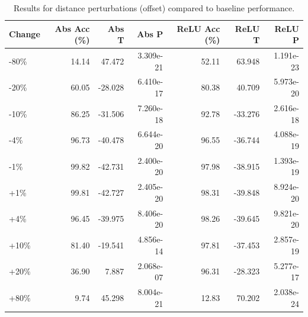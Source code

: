 \begin{table}[h]
    \centering
    \begin{tabular}{lrrrrrr}
    \hline
    Change & Abs Acc (\%) & Abs T & Abs P & ReLU Acc (\%) & ReLU T & ReLU P \\
    \hline
    -80\% & 14.14 & 47.472 & 3.309e-21 & 52.11 & 63.948 & 1.191e-23 \\
    -20\% & 60.05 & -28.028 & 6.410e-17 & 80.38 & 40.709 & 5.973e-20 \\
    -10\% & 86.25 & -31.506 & 7.260e-18 & 92.78 & -33.276 & 2.616e-18 \\
    -4\% & 96.73 & -40.478 & 6.644e-20 & 96.55 & -36.744 & 4.088e-19 \\
    -1\% & 99.82 & -42.731 & 2.400e-20 & 97.98 & -38.915 & 1.393e-19 \\
    +1\% & 99.81 & -42.727 & 2.405e-20 & 98.31 & -39.848 & 8.924e-20 \\
    +4\% & 96.45 & -39.975 & 8.406e-20 & 98.26 & -39.645 & 9.821e-20 \\
    +10\% & 81.40 & -19.541 & 4.856e-14 & 97.81 & -37.453 & 2.857e-19 \\
    +20\% & 36.90 & 7.887 & 2.068e-07 & 96.31 & -28.323 & 5.277e-17\\
    +80\% & 9.74 & 45.298 & 8.004e-21 & 12.83 & 70.202 & 2.038e-24 \\
    \hline
    \end{tabular}
    \caption{Results for distance perturbations (offset) compared to baseline performance.}
    \label{fig:distance_data}
\end{table}

